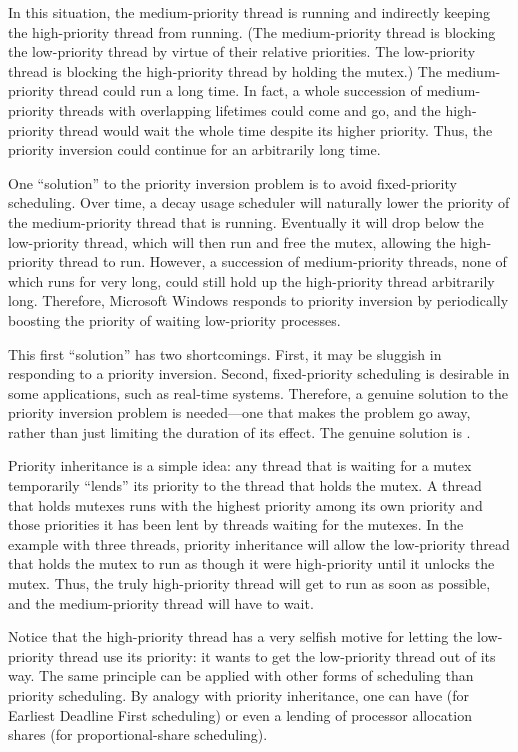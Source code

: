 In this situation, the medium-priority thread is running and
indirectly keeping the high-priority thread from running.  (The
medium-priority thread is blocking the low-priority thread by virtue
of their relative priorities.  The low-priority thread is blocking the
high-priority thread by holding the mutex.)  The medium-priority
thread could run a long time.  In fact, a whole succession of
medium-priority threads with overlapping lifetimes could come and
go, and the high-priority thread would wait the whole time despite its
higher priority.  Thus, the priority inversion could continue for an arbitrarily long time.

One ``solution'' to the priority inversion problem is to avoid
fixed-priority scheduling.  Over time, a decay usage scheduler will
naturally lower the priority of the medium-priority thread that is
running.  Eventually it will drop below the low-priority thread, which
will then run
and free the mutex, allowing the high-priority thread to run.
However, a succession of medium-priority threads, none of which runs
for very long, could still hold up the high-priority thread
arbitrarily long.  Therefore, Microsoft Windows responds to priority
inversion by periodically boosting the priority of waiting low-priority processes.

This first ``solution'' has two shortcomings.  First, it may be sluggish in
responding to a priority inversion.  Second, fixed-priority scheduling
is desirable in some applications, such as real-time systems.
Therefore, a genuine solution to the priority inversion
problem is needed---one that makes the problem go away, rather than just
limiting the duration of its effect.  The genuine solution is
.

Priority inheritance is a simple idea: any thread that is waiting for
a mutex temporarily ``lends'' its priority to the thread that holds
the mutex.  A thread that holds mutexes runs with the highest priority
among its own priority and those priorities it has been lent by threads waiting for the
mutexes.  In the example with three threads, priority inheritance will allow the low-priority thread that
holds the mutex to run as though it were high-priority until it
unlocks the mutex.  Thus, the truly high-priority thread will get to
run as soon as possible, and the medium-priority thread will have to
wait.

Notice that the high-priority thread has a very selfish motive for
letting the low-priority thread use its priority: it wants to get the
low-priority thread out of its way.  The same principle can be applied
with other forms of scheduling than priority scheduling.  By analogy
with priority inheritance, one can have  (for
Earliest Deadline First scheduling) or even a lending of processor
allocation shares (for proportional-share scheduling).

